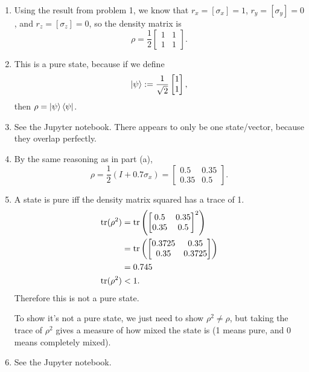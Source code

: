 \documentclass{article}
\begin{document}
\bigskip
\begin{prob}
\end{prob}
\begin{enumerate}[label=(\alph*)]
    \item Using the result from problem 1, we know that $r_x=[\sigma_x]=1$, $r_y=[\sigma_y]=0$, and $r_z=[\sigma_z]=0$, so the density matrix is
        \[ \rho = \frac{1}{2} \begin{bmatrix}
            1 & 1 \\
            1 & 1
        \end{bmatrix}. \]
    \item This is a pure state, because if we define
        \[ \left\lvert \psi \right\rangle := \frac{1}{\sqrt{2}} \begin{bmatrix}
            1 \\
            1
        \end{bmatrix}, \]
        then $\rho = \left\lvert \psi \right\rangle\left\langle \psi \right\rvert$.
    \item See the Jupyter notebook. There appears to only be one state/vector, because they overlap perfectly.
    \item By the same reasoning as in part (a),
        \[ \rho = \frac{1}{2} \left( I + 0.7 \sigma_x \right) = \begin{bmatrix}
            0.5 & 0.35 \\
            0.35 & 0.5
        \end{bmatrix}. \]
    \item A state is pure iff the density matrix squared has a trace of 1.
        \begin{align*}
            \operatorname{tr}(\rho^2) &= \operatorname{tr} \left( \begin{bmatrix}
                    0.5 & 0.35 \\
                    0.35 & 0.5
            \end{bmatrix}^2 \right) \\
                        &= \operatorname{tr} \left( \begin{bmatrix}
                                0.3725 & 0.35 \\
                                0.35 & 0.3725
                        \end{bmatrix} \right) \\
                        &= 0.745 \\
                    \operatorname{tr}(\rho^2) &< 1.
        \end{align*}
        Therefore this is not a pure state.
        \par
        To show it's not a pure state, we just need to show $\rho^2 \neq \rho$, but taking the trace of $\rho^2$ gives a measure of how mixed the state is (1 means pure, and 0 means completely mixed).
    \item See the Jupyter notebook.
\end{enumerate}
\end{document}
